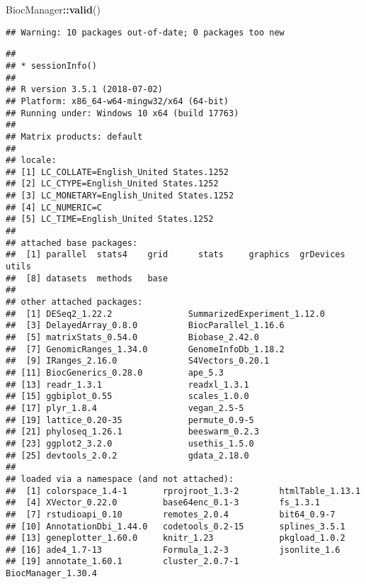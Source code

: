 \documentclass[]{article}
\newenvironment{Shaded}{\begin{snugshade}}{\end{snugshade}}
\newcommand{\KeywordTok}[1]{\textcolor[rgb]{0.13,0.29,0.53}{\textbf{#1}}}
\newcommand{\OperatorTok}[1]{\textcolor[rgb]{0.81,0.36,0.00}{\textbf{#1}}}
\newcommand{\NormalTok}[1]{#1}
\begin{document}
\begin{Shaded}
\begin{Highlighting}[]
\NormalTok{BiocManager}\OperatorTok{::}\KeywordTok{valid}\NormalTok{()}
\end{Highlighting}
\end{Shaded}

\begin{verbatim}
## Warning: 10 packages out-of-date; 0 packages too new
\end{verbatim}

\begin{verbatim}
## 
## * sessionInfo()
## 
## R version 3.5.1 (2018-07-02)
## Platform: x86_64-w64-mingw32/x64 (64-bit)
## Running under: Windows 10 x64 (build 17763)
## 
## Matrix products: default
## 
## locale:
## [1] LC_COLLATE=English_United States.1252 
## [2] LC_CTYPE=English_United States.1252   
## [3] LC_MONETARY=English_United States.1252
## [4] LC_NUMERIC=C                          
## [5] LC_TIME=English_United States.1252    
## 
## attached base packages:
##  [1] parallel  stats4    grid      stats     graphics  grDevices utils    
##  [8] datasets  methods   base     
## 
## other attached packages:
##  [1] DESeq2_1.22.2               SummarizedExperiment_1.12.0
##  [3] DelayedArray_0.8.0          BiocParallel_1.16.6        
##  [5] matrixStats_0.54.0          Biobase_2.42.0             
##  [7] GenomicRanges_1.34.0        GenomeInfoDb_1.18.2        
##  [9] IRanges_2.16.0              S4Vectors_0.20.1           
## [11] BiocGenerics_0.28.0         ape_5.3                    
## [13] readr_1.3.1                 readxl_1.3.1               
## [15] ggbiplot_0.55               scales_1.0.0               
## [17] plyr_1.8.4                  vegan_2.5-5                
## [19] lattice_0.20-35             permute_0.9-5              
## [21] phyloseq_1.26.1             beeswarm_0.2.3             
## [23] ggplot2_3.2.0               usethis_1.5.0              
## [25] devtools_2.0.2              gdata_2.18.0               
## 
## loaded via a namespace (and not attached):
##  [1] colorspace_1.4-1       rprojroot_1.3-2        htmlTable_1.13.1      
##  [4] XVector_0.22.0         base64enc_0.1-3        fs_1.3.1              
##  [7] rstudioapi_0.10        remotes_2.0.4          bit64_0.9-7           
## [10] AnnotationDbi_1.44.0   codetools_0.2-15       splines_3.5.1         
## [13] geneplotter_1.60.0     knitr_1.23             pkgload_1.0.2         
## [16] ade4_1.7-13            Formula_1.2-3          jsonlite_1.6          
## [19] annotate_1.60.1        cluster_2.0.7-1        BiocManager_1.30.4    

\end{verbatim}
\end{document}
